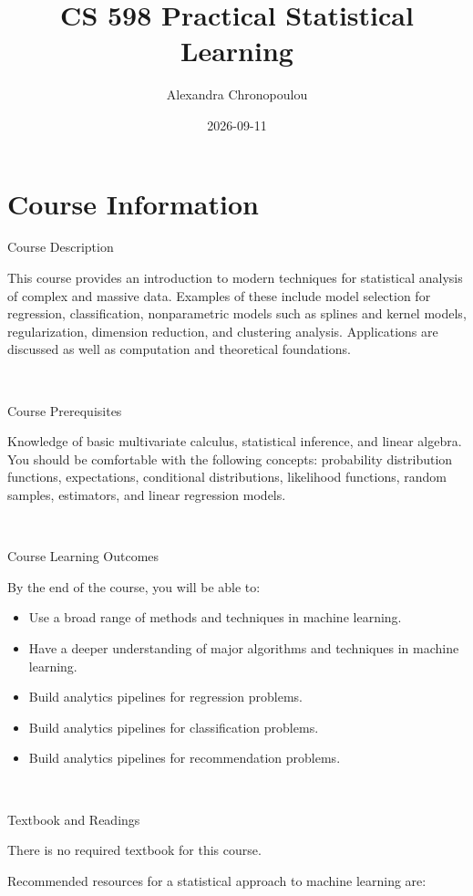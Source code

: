 \documentclass[
]{book}
\title{CS 598 Practical Statistical Learning}
\author{Alexandra Chronopoulou}
\date{2026-09-11}
\providecommand{\tightlist}{%
  \setlength{\itemsep}{0pt}\setlength{\parskip}{0pt}}
\begin{document}
\maketitle

{
\setcounter{tocdepth}{1}
\tableofcontents
}
\chapter*{Course Information}\label{course-information}

Course Description

This course provides an introduction to modern techniques for statistical analysis of complex and massive data. Examples of these include model selection for regression, classification, nonparametric models such as splines and kernel models, regularization, dimension reduction, and clustering analysis. Applications are discussed as well as computation and theoretical foundations.

~

Course Prerequisites

Knowledge of basic multivariate calculus, statistical inference, and linear algebra. You should be comfortable with the following concepts: probability distribution functions, expectations, conditional distributions, likelihood functions, random samples, estimators, and linear regression models.

~

Course Learning Outcomes

By the end of the course, you will be able to:

\begin{itemize}
\tightlist
\item
  Use a broad range of methods and techniques in machine learning.
\item
  Have a deeper understanding of major algorithms and techniques in machine learning.
\item
  Build analytics pipelines for regression problems.
\item
  Build analytics pipelines for classification problems.
\item
  Build analytics pipelines for recommendation problems.
\end{itemize}

~

Textbook and Readings

There is no required textbook for this course.

Recommended resources for a statistical approach to machine learning are:
\end{document}

